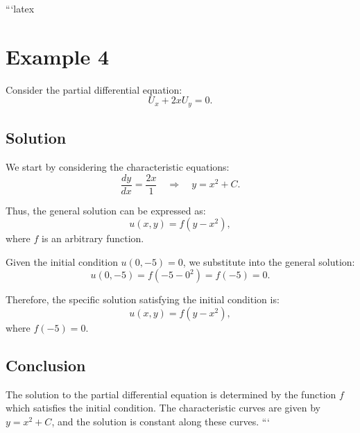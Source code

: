 ```latex
\section*{Example 4}

Consider the partial differential equation:
\[
U_x + 2x U_y = 0.
\]

\subsection*{Solution}

We start by considering the characteristic equations:
\[
\frac{dy}{dx} = \frac{2x}{1} \quad \Rightarrow \quad y = x^2 + C.
\]

Thus, the general solution can be expressed as:
\[
u(x, y) = f(y - x^2),
\]
where \( f \) is an arbitrary function.

Given the initial condition \( u(0, -5) = 0 \), we substitute into the general solution:
\[
u(0, -5) = f(-5 - 0^2) = f(-5) = 0.
\]

Therefore, the specific solution satisfying the initial condition is:
\[
u(x, y) = f(y - x^2),
\]
where \( f(-5) = 0 \).

\subsection*{Conclusion}

The solution to the partial differential equation is determined by the function \( f \) which satisfies the initial condition. The characteristic curves are given by \( y = x^2 + C \), and the solution is constant along these curves.
```
